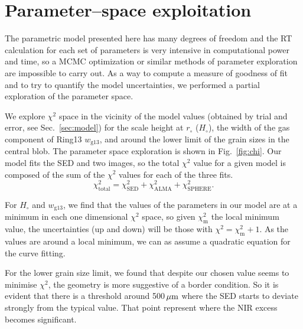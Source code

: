 \documentclass[fleqn,usenatbib,useAMS]{mnras}
\begin{document}

\appendix

\section{Parameter--space exploitation} \label{sec:Appendix}

The parametric model presented here has many degrees of freedom and the RT calculation for each set of parameters is very intensive in computational power and time, so a MCMC optimization or similar methods of parameter exploration are impossible to carry out. As a way to compute a measure of goodness of fit and to try to quantify the model uncertainties, we performed a partial exploration of the parameter space. 

We explore $\chi^2$ space in the vicinity of the model values (obtained by trial and error, see Sec.~\ref{sec:model}) for the scale height at $r_\circ$ ($H_\circ$), the width of the gas component of Ring13 $w_{\mathrm{g13}}$, and around the lower limit of the grain sizes in the central blob. The parameter space exploration is shown in Fig.~\ref{fig:chi}. Our model fits the SED and two images, so the total $\chi^2$ value for a given model is composed of the sum of the $\chi^2$ values for each of the three fits.
\begin{equation}
    \chi^2_{\mathrm{total}}=\chi^2_{\mathrm{SED}}+\chi^2_{\mathrm{ALMA}}+\chi^2_{\mathrm{SPHERE}}.
\end{equation}

For $H_\circ$ and $w_{\mathrm{g13}}$, we find that the values of the parameters in our model are at a minimum in each one dimensional $\chi^2$ space, so given $\chi^2_\mathrm{m}$ the local minimum value, the uncertainties (up and down) will be those with $\chi^2=\chi^2_\mathrm{m}+1$. As the values are around a local minimum, we can as assume a quadratic equation for the curve fitting.

For the lower grain size limit, we found that despite our chosen value seems to minimise $\chi^2$, the geometry is more suggestive of a border condition. So it is evident that there is a threshold around 500\,$\hbox{$\mu$m}$ where the SED starts to deviate strongly from the typical value. That point represent where the NIR excess becomes significant.

\end{document}
